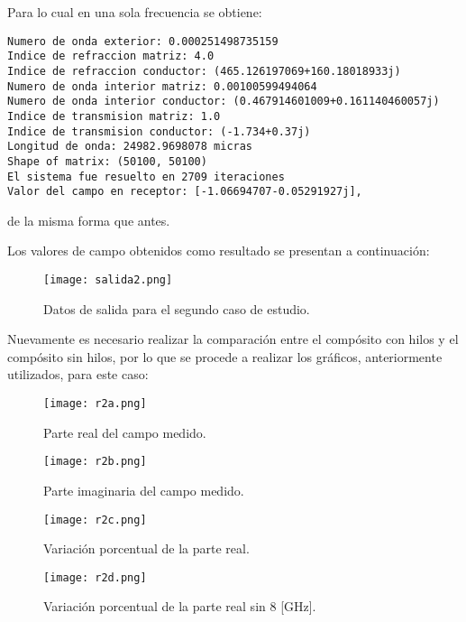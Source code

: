 \documentclass[12pt,letterpaper]{article}
\numberwithin{equation}{section}
\begin{document}
Para lo cual en una sola frecuencia se obtiene:

\begin{lstlisting}
Numero de onda exterior: 0.000251498735159
Indice de refraccion matriz: 4.0
Indice de refraccion conductor: (465.126197069+160.18018933j)
Numero de onda interior matriz: 0.00100599494064
Numero de onda interior conductor: (0.467914601009+0.161140460057j)
Indice de transmision matriz: 1.0
Indice de transmision conductor: (-1.734+0.37j)
Longitud de onda: 24982.9698078 micras
Shape of matrix: (50100, 50100)
El sistema fue resuelto en 2709 iteraciones
Valor del campo en receptor: [-1.06694707-0.05291927j],
\end{lstlisting}
\noindent de la misma forma que antes.

Los valores de campo obtenidos como resultado se presentan a continuación:

\begin{figure}[H]
	\centering\texttt{[image: salida2.png]}\\
	\caption{Datos de salida para el segundo caso de estudio.}
	\label{fig:salida2}
\end{figure} 

Nuevamente es necesario realizar la comparación entre el compósito con hilos y el compósito sin hilos, por lo que se procede a realizar los gráficos, anteriormente utilizados, para este caso:

\begin{figure}[H]
	\centering\texttt{[image: r2a.png]}\\
	\caption{Parte real del campo medido.}
	\label{fig:r2a}
\end{figure} 

\begin{figure}[H]
	\centering\texttt{[image: r2b.png]}\\
	\caption{Parte imaginaria del campo medido.}
	\label{fig:r2b}
\end{figure} 

\begin{figure}[H]
	\centering\texttt{[image: r2c.png]}\\
	\caption{Variación porcentual de la parte real.}
	\label{fig:r2c}
\end{figure} 

\begin{figure}[H]
	\centering\texttt{[image: r2d.png]}\\
	\caption{Variación porcentual de la parte real sin 8 [GHz].}
	\label{fig:r2d}
\end{figure} 
\end{document}
